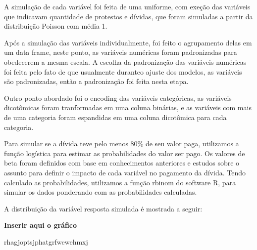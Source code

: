 A simulação de cada variável foi feita de uma uniforme, com exeção das variáveis que indicavam quantidade de protestos e dívidas, que foram simuladas a partir da distribuição Poisson com média 1.

Após a simulação das variáveis individualmente, foi feito o agrupamento delas em um data frame, neste ponto, as variáveis numéricas foram padronizadas para obedecerem a mesma escala. A escolha da padronização das variáveis numéricas foi feita pelo fato de que usualmente duranteo ajuste dos modelos, as variáveis são padronizadas, então a padronização foi feita nesta etapa.

Outro ponto abordado foi o encoding das variáveis categóricas, as variáveis dicotômicas foram tranformadas em uma coluna binárias, e as variáveis com mais de uma categoria foram espandidas em uma coluna dicotômica para cada categoria.

Para simular se a dívida teve pelo menos 80\% de seu valor paga, utilizamos a função logística para estimar as probabilidades do valor ser pago. Os valores de beta foram definidos com base em conhecimentos anteriores e estudos sobre o assunto para definir o impacto de cada variável no pagamento da dívida. Tendo calculado as probabilidades, utilizamos a função rbinom do software R, para simular os dados ponderando com as probabilidades calculadas.

A distribuição da variável resposta simulada é mostrada a seguir:



 \begin{center}
 \textbf{Inserir aqui o gráfico}
\end{center}


rhagjoptsjphatgrfwewehmxj
